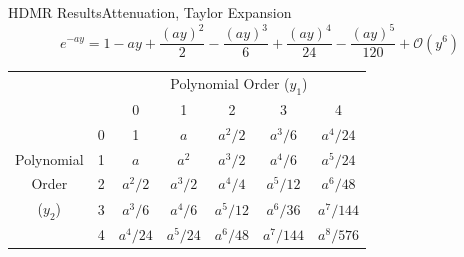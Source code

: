 \documentclass{beamer}
\begin{document}
\begin{frame}{HDMR Results}{Attenuation, Taylor Expansion}%
  \begin{equation*}
    e^{-ay} = 1 - ay + \frac{(ay)^2}{2} - \frac{(ay)^3}{6} + \frac{(ay)^4}{24} - \frac{(ay)^5}{120} +
          \mathcal{O}(y^6)
  \end{equation*}
\begin{table}
  \centering
  \begin{tabular}{|c c|c c c c c|}
    \cline{3-7}\multicolumn{2}{c|}{ } & \multicolumn{5}{c|}{Polynomial Order ($y_1$)} \\
               \multicolumn{2}{c|}{ } & 0 & 1 & 2 & 3 & 4 \\
    \hline & 0 & 1        & $a$      & $a^2/2$  & $a^3/6$   & \cellcolor{Gray6}$a^4/24$  \\
Polynomial & 1 & $a$      & $a^2   $ & $a^3/2 $ & \cellcolor{Gray6}$a^4/6  $ & $a^5/24 $ \\
Order      & 2 & $a^2/2$  & $a^3/2 $ & \cellcolor{Gray6}$a^4/4 $ & $a^5/12 $ & $a^6/48 $ \\
($y_2$)    & 3 & $a^3/ 6$ & \cellcolor{Gray6}$a^4/ 6$ & $a^5/12$ & $a^6/ 36$ & $a^7/144$ \\
           & 4 & \cellcolor{Gray6}$a^4/24$ & $a^5/24$ & $a^6/48$ & $a^7/144$ & $a^8/576$ \\
    \hline
  \end{tabular}
\end{table}
\end{frame}
\end{document}
